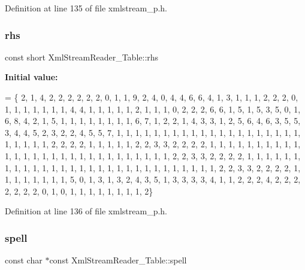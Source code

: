 Definition at line 135 of file xmlstream\+\_\+p.\+h.

\mbox{\label{class_xml_stream_reader___table_a0cba675b003389c621eb944116947e55}} 
\subsubsection{\texorpdfstring{rhs}{rhs}}
{\footnotesize\ttfamily const short Xml\+Stream\+Reader\+\_\+\+Table\+::rhs\hspace{0.3cm}{\ttfamily [static]}}

{\bfseries Initial value\+:}
\begin{DoxyCode}
= \{
  2, 1, 4, 2, 2, 2, 2, 2, 2, 0, 
  1, 1, 9, 2, 4, 0, 4, 4, 6, 6, 
  4, 1, 3, 1, 1, 1, 2, 2, 2, 0, 
  1, 1, 1, 1, 1, 1, 1, 4, 4, 1, 
  1, 1, 1, 1, 2, 1, 1, 1, 0, 2, 
  2, 2, 6, 6, 1, 5, 1, 5, 3, 5, 
  0, 1, 6, 8, 4, 2, 1, 5, 1, 1, 
  1, 1, 1, 1, 1, 1, 6, 7, 1, 2, 
  2, 1, 4, 3, 3, 1, 2, 5, 6, 4, 
  6, 3, 5, 5, 3, 4, 4, 5, 2, 3, 
  2, 2, 4, 5, 5, 7, 1, 1, 1, 1, 
  1, 1, 1, 1, 1, 1, 1, 1, 1, 1, 
  1, 1, 1, 1, 1, 1, 1, 1, 1, 1, 
  1, 2, 2, 2, 2, 1, 1, 1, 1, 1, 
  2, 2, 3, 3, 2, 2, 2, 2, 1, 1, 
  1, 1, 1, 1, 1, 1, 1, 1, 1, 1, 
  1, 1, 1, 1, 1, 1, 1, 1, 1, 1, 
  1, 1, 1, 1, 1, 1, 2, 2, 3, 3, 
  2, 2, 2, 2, 1, 1, 1, 1, 1, 1, 
  1, 1, 1, 1, 1, 1, 1, 1, 1, 1, 
  1, 1, 1, 1, 1, 1, 1, 1, 1, 1, 
  1, 1, 1, 2, 2, 3, 3, 2, 2, 2, 
  2, 1, 1, 1, 1, 1, 1, 1, 1, 5, 
  0, 1, 3, 1, 3, 2, 4, 3, 5, 1, 
  3, 3, 3, 3, 4, 1, 1, 2, 2, 2, 
  4, 2, 2, 2, 2, 2, 2, 2, 0, 1, 
  0, 1, 1, 1, 1, 1, 1, 1, 1, 2\}
\end{DoxyCode}


Definition at line 136 of file xmlstream\+\_\+p.\+h.

\mbox{\label{class_xml_stream_reader___table_ab71f7cb698674a7fd082b6142b087ea2}} 
\subsubsection{\texorpdfstring{spell}{spell}}
{\footnotesize\ttfamily const char $\ast$const Xml\+Stream\+Reader\+\_\+\+Table\+::spell\hspace{0.3cm}{\ttfamily [static]}}

